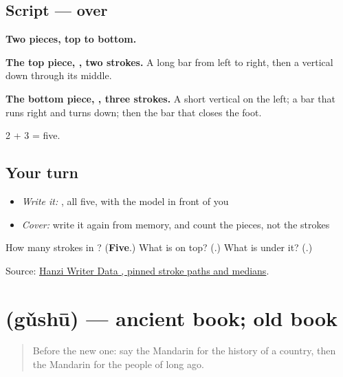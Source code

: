 \subsection*{Script —  over }

\begin{quote}
\end{quote}

\textbf{Two pieces, top to bottom.}

\textbf{The top piece, , two strokes.} A long bar from left to right, then a vertical down through its middle.

\textbf{The bottom piece, , three strokes.} A short vertical on the left; a bar that runs right and turns down; then the bar that closes the foot.

2 + 3 = five.

\subsection*{Your turn}
\begin{itemize}
\raggedright
  \item \emph{Write it:} , all five, with the model in front of you
  \item \emph{Cover:} write it again from memory, and count the pieces, not the strokes
\end{itemize}

\begin{tcolorbox}[breakable,colback=teal!4,colframe=teal!35!black,title={Before you move on}]
How many strokes in ? (\textbf{Five}.) What is on top? (\textbf{}.) What is under it? (\textbf{}.)

Source: \href{https://raw.githubusercontent.com/chanind/hanzi-writer-data/68d10a4b21150cae5e1ebbd223eed289cf32d90c/data/\%E5\%8F\%A4.json}{Hanzi Writer Data , pinned stroke paths and medians}.
\end{tcolorbox}
\section[\texorpdfstring{\zh{古书} (gǔshū)}{古书 (gǔshū)}]{ (gǔshū) — ancient book; old book}

\label{lesson:ZH-C321-gushu}



\begin{quote}
Before the new one: say the Mandarin for the history of a country, then the Mandarin for the people of long ago.
\end{quote}

